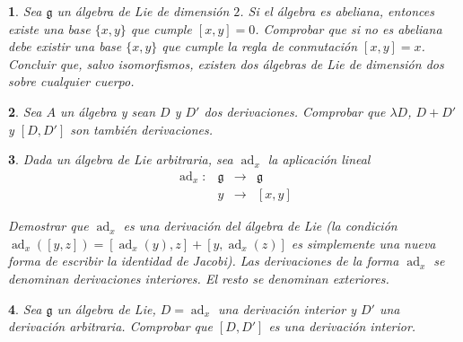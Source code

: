 \documentclass[a4paper,draft,12pt]{article}
\newtheorem{pro1}{}%
\newenvironment{pro}{\begin{pro1} \rm} {\end{pro1}}
\newcommand{\g}{\mathfrak{g}}%
\newcommand{\lto}{\longrightarrow}%
\newcommand{\df}[1]{\textsf{\color{blue}#1}}
\DeclareMathOperator{\ad}{ad}  %
\begin{document}
\begin{pro}

Sea $\g$ un álgebra de Lie de dimensión $2$.  Si el álgebra es abeliana, entonces existe una base $\{x,y\}$ que cumple $[x,y]=0$.  Comprobar que si no es abeliana debe existir una base $\{x,y\}$ que cumple la regla de conmutación $[x,y]=x$.  Concluir que, salvo isomorfismos, existen dos álgebras de Lie de dimensión dos sobre cualquier cuerpo.

\end{pro}

\begin{pro}

Sea $A$ un álgebra y sean $D$ y $D'$ dos derivaciones. Comprobar que $\lambda D$, $D+D'$ y $[D,D']$ son también derivaciones.

\end{pro}

\begin{pro}

Dada un álgebra de Lie arbitraria, sea $\ad_x$ la aplicación lineal 
\[
\begin{array}{lccc}
\ad_x: & \g & \lto &\g \\
    & y& \lto & [x,y]
\end{array}
\]

Demostrar que $\ad_x$ es una derivación del álgebra de Lie (la condición $\ad_x([y,z])=[\ad_x (y), z]+[y,\ad_x (z)]$ es simplemente una nueva forma de escribir la identidad de Jacobi). Las derivaciones de la forma $\ad_x$ se denominan   \df{derivaciones interiores}.  El resto se denominan   \df{exteriores}. 

\end{pro}

\begin{pro}

Sea $\g$ un álgebra de Lie, $D=\ad_x$ una derivación interior y $D'$ una derivación arbitraria. Comprobar que $[D,D']$ es una derivación interior. 

\end{pro}
\end{document}
